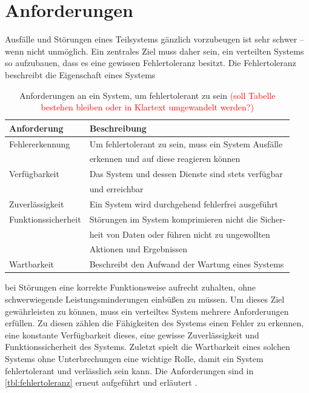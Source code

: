 \documentclass[12pt,a4paper,parskip=half]{scrreprt}
\begin{document}
\section{Anforderungen}
Ausfälle und Störungen eines Teilsystems gänzlich vorzubeugen ist sehr schwer -- wenn nicht unmöglich. Ein zentrales Ziel muss daher sein, ein verteilten Systems so aufzubauen, dass es eine gewissen Fehlertoleranz besitzt. Die Fehlertoleranz beschreibt die Eigenschaft eines Systems 
\begin{table}[h]
	\centering
	\begin{tabular}[h]{ll}
		\toprule
		Anforderung 		& Beschreibung \\
		\midrule
		Fehlererkennung		& Um fehlertolerant zu sein, muss ein System Ausfälle\\
							& erkennen und auf diese reagieren können \vspace{4pt} \\
		Verfügbarkeit 		& Das System und dessen Dienste sind stets verfügbar \\
							& und erreichbar \vspace{4pt}\\
		Zuverlässigkeit		& Ein System wird durchgehend fehlerfrei ausgeführt  \vspace{4pt} \\
		Funktionssicherheit	& Störungen im System komprimieren nicht die Sicher-\\
							& heit von Daten oder führen nicht zu ungewollten \\
							& Aktionen und Ergebnissen \vspace{4pt}\\
		Wartbarkeit 		& Beschreibt den Aufwand der Wartung eines Systems\\		
		\bottomrule
	\end{tabular}
	\captionsetup{font = small}
	\caption{Anforderungen an ein System, um fehlertolerant zu sein 
		\textcolor{red}{(soll Tabelle bestehen bleiben oder in Klartext umgewandelt werden?)}}
	\label{tbl:fehlertoleranz}
\end{table}
bei Störungen eine korrekte Funktionsweise aufrecht zuhalten, ohne schwerwiegende Leistungsminderungen einbüßen zu müssen. Um dieses Ziel gewährleisten zu können, muss ein verteiltes System mehrere Anforderungen erfüllen. Zu diesen zählen die Fähigkeiten des Systems einen Fehler zu erkennen, eine konstante Verfügbarkeit dieses, eine gewisse Zuverlässigkeit und Funktionssicherheit des Systems. Zuletzt spielt die Wartbarkeit eines solchen Systems ohne Unterbrechungen eine wichtige Rolle, damit ein System fehlertolerant und verlässlich sein kann. Die Anforderungen sind in \autoref{tbl:fehlertoleranz} erneut aufgeführt und erläutert \cite{vS-TU-Braunschweig}. 
\end{document}
